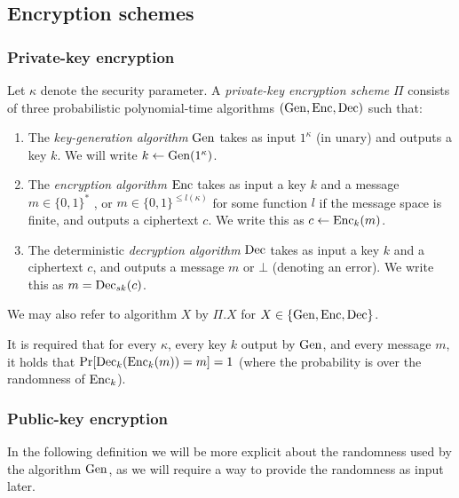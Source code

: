 \subsection{Encryption schemes}

\subsubsection{Private-key encryption}

\begin{definition}
	Let $\kappa$ denote the security parameter. A \emph{private-key encryption scheme} $\Pi$ consists of three probabilistic polynomial-time algorithms $(\mathrm{Gen}, \mathrm{Enc}, \mathrm{Dec})$ such that:
	\begin{enumerate}[1.]
		\item The \emph{key-generation algorithm} $\mathrm{Gen}$ takes as input $1^\kappa$ (in unary) and outputs a key $k$. We will write $k \leftarrow \mathrm{Gen}(1^\kappa)$.
		\item The \emph{encryption algorithm} $\mathrm{Enc}$ takes as input a key $k$ and a message $m \in \{0, 1\}^*$ , or $m \in \{0, 1\}^{\le l(\kappa)}$ for some function $l$ if the message space is finite, and outputs a ciphertext $c$. We write this as $c \leftarrow \mathrm{Enc}_k(m)$.
		\item The deterministic \emph{decryption algorithm} $\mathrm{Dec}$ takes as input a key $k$ and a ciphertext $c$, and outputs a message $m$ or $\bot$ (denoting an error). We write this as $m = \mathrm{Dec}_{sk}(c)$.
	\end{enumerate}

	We may also refer to algorithm $X$ by $\Pi.X$ for $X \in \{\mathrm{Gen}, \mathrm{Enc}, \mathrm{Dec}\}$.

	It is required that for every $\kappa$, every key $k$ output by $\mathrm{Gen}$, and every message $m$, it holds that $\pr{\dec_k(\enc_k(m)) = m} = 1$ (where the probability is over the randomness of $\mathrm{Enc}_k$).
\end{definition}

\subsubsection{Public-key encryption}

In the following definition we will be more explicit about the randomness used by the algorithm $\mathrm{Gen}$, as we will require a way to provide the randomness as input later.

